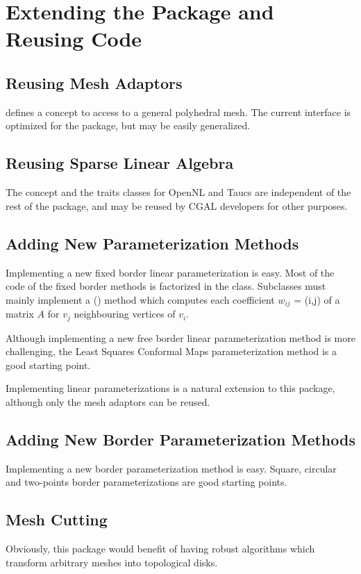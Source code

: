 \section{Extending the Package and Reusing Code}

\subsection{Reusing Mesh Adaptors}

 defines a concept to access to a
general polyhedral mesh.  The current interface is optimized for the
 package, but may be easily generalized.


\subsection{Reusing Sparse Linear Algebra}

The  concept and the traits classes
for OpenNL and {\sc Taucs} are independent of the rest of the
 package, and may be reused by
CGAL developers for other purposes.


\subsection{Adding New Parameterization Methods}

Implementing a new fixed border linear parameterization is easy.  Most
of the code of the fixed border methods is factorized in the
class.  Subclasses must mainly
implement a () method which computes each
coefficient $w_{ij}$ = (i,j) of a matrix $A$ for $v_j$ neighbouring
vertices of $v_i$.

Although implementing a new free border linear parameterization
method is more challenging, the Least Squares Conformal Maps
parameterization method is a good starting point.

Implementing  linear parameterizations is a natural extension
to this package, although only the mesh adaptors can be reused.


\subsection{Adding New Border Parameterization Methods}

Implementing a new border parameterization method is easy.
Square, circular and two-points border parameterizations are good starting points.


\subsection{Mesh Cutting}

Obviously, this package would benefit of having robust algorithms
which transform arbitrary meshes into topological disks.

